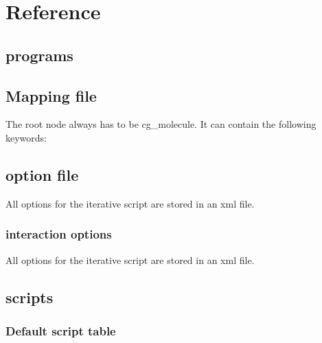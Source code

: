 \chapter{Reference}
\section{programs}

\section{Mapping file}
\label{sec:ref_mapping}
The root node always has to be cg\_molecule. It can contain the following keywords:



\section{option file}
All options for the iterative script are stored in an xml file.
\label{sec:ref_options}


\subsection{interaction options}
All options for the iterative script are stored in an xml file.
\label{sec:ref_interaction}

\vfill

\section{scripts}
\subsection{Default script table}


